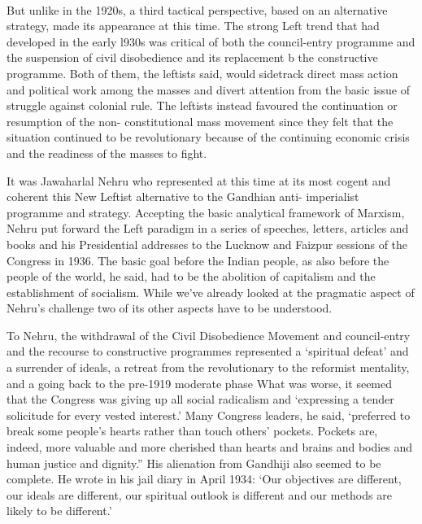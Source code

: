 \paragraph*{}

But unlike in the 1920s, a third tactical perspective, based on an alternative strategy, made its appearance at this time. The strong Left trend that had developed in the early l930s was critical of both the council-entry programme and the suspension of civil disobedience and its replacement b the constructive programme. Both of them, the leftists said, would sidetrack direct mass action and political work among the masses and divert attention from the basic issue of struggle against colonial rule. The leftists instead favoured the continuation or resumption of the non- constitutional mass movement since they felt that the situation continued to be revolutionary because of the continuing economic crisis and the readiness of the masses to fight. 

It was Jawaharlal Nehru who represented at this time at its most cogent and coherent this New Leftist alternative to the Gandhian anti- imperialist programme and strategy. Accepting the basic analytical framework of Marxism, Nehru put forward the Left paradigm in a series of speeches, letters, articles and books and his Presidential addresses to the Lucknow and Faizpur sessions of the Congress in 1936. The basic goal before the Indian people, as also before the people of the world, he said, had to be the abolition of capitalism and the establishment of socialism. While we've already looked at the pragmatic aspect of Nehru's challenge two of its other aspects have to be understood. 

To Nehru, the withdrawal of the Civil Disobedience Movement and council-entry and the recourse to constructive programmes represented a `spiritual defeat' and a surrender of ideals, a retreat from the revolutionary to the reformist mentality, and a going back to the pre-1919 moderate phase What was worse, it seemed that the Congress was giving up all social radicalism and `expressing a tender solicitude for every vested interest.' Many Congress leaders, he said, `preferred to break some people's hearts rather than touch others' pockets. Pockets are, indeed, more valuable and more cherished than hearts and brains and bodies and human justice and dignity.'' His alienation from Gandhiji also seemed to be complete. He wrote in his jail diary in April 1934: `Our objectives are different, our ideals are different, our spiritual outlook is different and our methods are likely to be different.' 


